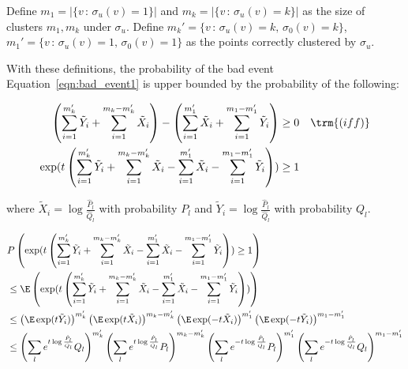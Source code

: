 \documentclass{article}
\begin{document}
Define $m_1 = |\{ v \,:\, \sigma_u(v) = 1 \}|$ and $m_k = | \{ v \,:\, \sigma_u(v) = k \}|$ as the size of clusters $m_1, m_k$ under $\sigma_u$. Define $m_k' = \{ v \,:\, \sigma_u(v) = k,\, \sigma_0(v) = k \}$, $m_1' = \{ v \,:\, \sigma_u(v) = 1 ,\, \sigma_0(v) = 1\}$ as the points correctly clustered by $\sigma_u$. 

With these definitions, the probability of the bad event Equation~\ref{eqn:bad_event1} is upper bounded by the probability of the following:

\begin{align*}
\left( \sum_{i=1}^{m_k'} \tilde{Y}_i + \sum_{i=1}^{m_k - m'_k} \tilde{X}_i \right) - 
\left( \sum_{i=1}^{m_1'} \tilde{X}_i + \sum_{i=1}^{m_1 - m_1'} \tilde{Y}_i  \right) &\geq 0  \quad \trm{(iff)} \\
\exp( t \left( \sum_{i=1}^{m_k'} \tilde{Y}_i + \sum_{i=1}^{m_k - m_k'} \tilde{X}_i - 
     \sum_{i=1}^{m_1'}  \tilde{X}_i - \sum_{i=1}^{m_1 - m_1'} \tilde{Y}_i  \right) ) &\geq 1 
\end{align*}

 where $\tilde{X}_i = \log \frac{\hat{P}_l}{\hat{Q}_l}$ with probability $P_l$ and $\tilde{Y}_i = \log \frac{\hat{P}_l}{\hat{Q}_l}$ with probability $Q_l$. 



\begin{align*}
& P \left( \exp( t \left( \sum_{i=1}^{m_k'} \tilde{Y}_i + \sum_{i=1}^{m_k - m_k'} \tilde{X}_i- 
     \sum_{i=1}^{m_1'}  \tilde{X}_i - \sum_{i=1}^{m_1 - m_1'} \tilde{Y}_i  \right) ) \geq 1 \right) \\ 
&\leq \E \left( 
\exp( t \left( \sum_{i=1}^{m_k'} \tilde{Y}_i + \sum_{i=1}^{m_k - m_k'} \tilde{X}_i - 
     \sum_{i=1}^{m_1'}  \tilde{X}_i - \sum_{i=1}^{m_1 - m_1'} \tilde{Y}_i  \right) )
 \right) \\ 
&\leq \left( \E \exp( t \tilde{Y}_i ) \right)^{m_k'} 
      \left( \E \exp(t \tilde{X}_i ) \right)^{m_k - m_k'}  
    \left( \E \exp( - t \tilde{X}_i) \right)^{m_1'} 
    \left( \E \exp( -t \tilde{Y}_i ) \right)^{m_1 - m_1'} \\
&\leq \left( \sum_l e^{t \log \frac{\hat{P}_l}{\hat{Q}_l} } Q_l \right)^{m_k'}  
      \left( \sum_l e^{t \log \frac{\hat{P}_l}{\hat{Q}_l}} P_l \right)^{m_k - m_k'} 
      \left( \sum_l e^{- t \log \frac{\hat{P}_l}{\hat{Q_l}} } P_l \right)^{m_1'}
     \left( \sum_l e^{-t \log \frac{\hat{P}_l}{\hat{Q}_l}} Q_l \right)^{m_1 - m_1'}
\end{align*}
\end{document}
